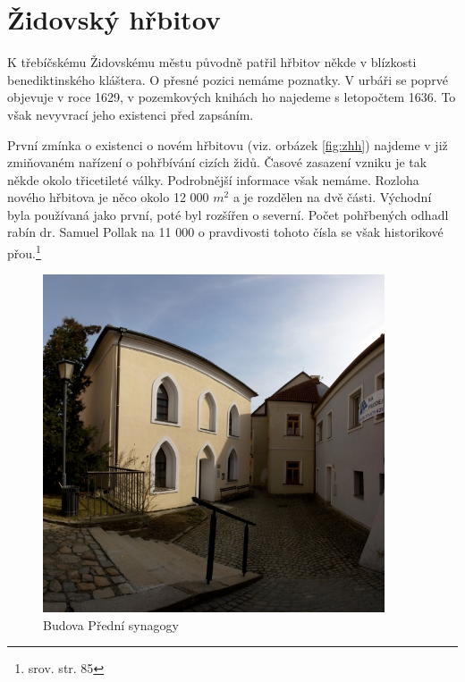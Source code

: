 \documentclass[a4paper,oneside,12pt]{report}
\begin{document}
\section{Židovský hřbitov}

K třebíčskému Židovskému městu původně patřil hřbitov někde v blízkosti benediktinského kláštera.
O přesné pozici nemáme poznatky.
V urbáři se poprvé objevuje v roce 1629, v pozemkových knihách ho najedeme s letopočtem 1636.
To však nevyvrací jeho existenci před zapsáním.

První zmínka o existenci o novém hřbitovu (viz. orbázek \ref{fig:zhh}) najdeme v již zmiňovaném nařízení o pohřbívání cizích židů.
Časové zasazení vzniku je tak někde okolo třicetileté války.
Podrobnější informace však nemáme.
Rozloha nového hřbitova je něco okolo 12 000 $m^2$ a je rozdělen na dvě části.
Východní byla používaná jako první, poté byl rozšířen o severní.
Počet pohřbených odhadl rabín dr. Samuel Pollak na 11 000 o pravdivosti tohoto čísla se však historikové přou.\footnote{srov. \cite{Fiser2005} str. 85}

\newpage

\begin{figure}
	\centering
	\includegraphics[height=10cm]{../img/predniSynagogaBudova}
	\caption[Přední synagoga \text{[online]} MKS Třebíč. Dostupné z: \url{https://www.mkstrebic.cz/data_5/fotogalerie/15normal.jpg} \text{[cit. 2020-03-26]}]{
		Budova Přední synagogy
	}
	\label{fig:psb}
\end{figure}
\end{document}
